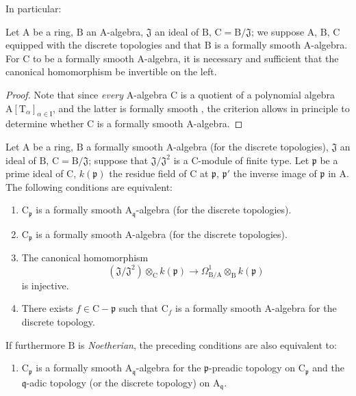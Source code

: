 In particular:
\begin{corollary}[22.6.3]
\label{0.22.6.3}
Let $\mathrm{A}$ be a ring, $\mathrm{B}$ an $\mathrm{A}$-algebra, $\mathfrak{J}$ an ideal of $\mathrm{B}$, $\mathrm{C}=\mathrm{B}/\mathfrak{J}$; we suppose $\mathrm{A}$, $\mathrm{B}$, $\mathrm{C}$ equipped with the discrete topologies and that $\mathrm{B}$ is a formally smooth $\mathrm{A}$-algebra.
For $\mathrm{C}$ to be a formally smooth $\mathrm{A}$-algebra, it is necessary and sufficient that the canonical homomorphism  be invertible on the left.
\end{corollary}

\begin{proof}
Note that since \emph{every} $\mathrm{A}$-algebra $\mathrm{C}$ is a quotient of a polynomial algebra $\mathrm{A}[\mathrm{T}_\alpha]_{\alpha\in\mathrm{I}}$, and the latter is formally smooth , the criterion  allows in principle to determine whether $\mathrm{C}$ is a formally smooth $\mathrm{A}$-algebra.
\end{proof}

\begin{proposition}[22.6.4]
\label{0.22.6.4}
Let $\mathrm{A}$ be a ring, $\mathrm{B}$ a formally smooth $\mathrm{A}$-algebra (for the discrete topologies), $\mathfrak{J}$ an ideal of $\mathrm{B}$, $\mathrm{C}=\mathrm{B}/\mathfrak{J}$; suppose that $\mathfrak{J}/\mathfrak{J}^2$ is a $\mathrm{C}$-module of finite type.
Let $\mathfrak{p}$ be a prime ideal of $\mathrm{C}$, $k(\mathfrak{p})$ the residue field of $\mathrm{C}$ at $\mathfrak{p}$, $\mathfrak{p}'$ the inverse image of $\mathfrak{p}$ in $\mathrm{A}$.
The following conditions are equivalent:
\begin{enumerate}
  \item[a)] $\mathrm{C}_\mathfrak{p}$ is a formally smooth $\mathrm{A}_{\mathfrak{q}}$-algebra (for the discrete topologies).
  \item[a')] $\mathrm{C}_\mathfrak{p}$ is a formally smooth $\mathrm{A}$-algebra (for the discrete topologies).
  \item[b)] The canonical homomorphism
\[
\label{0.22.6.4.1}
  (\mathfrak{J}/\mathfrak{J}^2)\otimes_\mathrm{C}k(\mathfrak{p})\to\Omega^1_{\mathrm{B}/\mathrm{A}}\otimes_\mathrm{B}k(\mathfrak{p})
  \tag{22.6.4.1}
\]
  is injective.
  \item[c)] There exists $f\in\mathrm{C}-\mathfrak{p}$ such that $\mathrm{C}_f$ is a formally smooth $\mathrm{A}$-algebra for the discrete topology.
\end{enumerate}

If furthermore $\mathrm{B}$ is \emph{Noetherian}, the preceding conditions are also equivalent to:
\begin{enumerate}
  \item[d)] $\mathrm{C}_\mathfrak{p}$ is a formally smooth $\mathrm{A}_{\mathfrak{q}}$-algebra for the $\mathfrak{p}$-preadic topology on $\mathrm{C}_\mathfrak{p}$ and the $\mathfrak{q}$-adic topology (or the discrete topology) on $\mathrm{A}_{\mathfrak{q}}$.
\end{enumerate}
\end{proposition}

